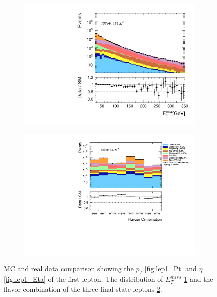 \begin{figure}
{\begin{subfigure}{.405\textwidth}
        \includegraphics[width=\textwidth]{Figures/FeaturesHistograms/met_Et.pdf}
        \vspace{-0.75cm}
        \caption{}
        \label{fig:met_Et}
    \end{subfigure}
    \hfill
    \begin{subfigure}{.525\textwidth}
        \includegraphics[width=\textwidth]{Figures/FeaturesHistograms/flcomp.pdf}
        \vspace{-0.75cm}
        \caption{}
        \label{fig:flcomp}
    \end{subfigure}
    }
    \caption[\acs{MC} simulated and measured data comparison showing the $p_T$ and $\eta$ of the leading lepton 
    as well as the $E_T^{miss}$ and flavor combination from each event.]{\ac{MC} and real data comparison showing the $p_T$ \ref{fig:lep1_Pt} and 
    $\eta$ \ref{fig:lep1_Eta} of the first lepton. The distribution of $E_T^{miss}$ \ref{fig:met_Et}
    and the flavor combination of the three final state leptons \ref{fig:flcomp}.}
    \label{fig:Dist1}
\end{figure}